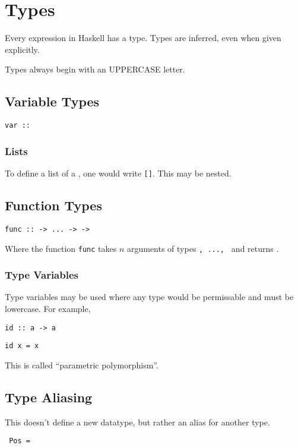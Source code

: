 \section{Types}

Every expression in Haskell has a type. Types are inferred, even when given explicitly.

Types always begin with an UPPERCASE letter.

\subsection{Variable Types}

\begin{center}
  \texttt{var :: }
\end{center}

\subsubsection{Lists}

To define a list of a \texttt{}, one would write \texttt{[]}. This may be nested.

\subsection{Function Types}

\begin{center}
  \texttt{func ::  -> ... ->  -> }
\end{center}

Where the function \texttt{func} takes $n$ arguments of types \texttt{, ..., } and returns \texttt{}.

\subsubsection{Type Variables}

Type variables may be used where any type would be permissable and must be lowercase. For example,

\begin{center}
  \texttt{id :: a -> a}

  \texttt{id x = x}
\end{center}

This is called ``parametric polymorphism''.

\subsection{Type Aliasing}
This doesn't define a new datatype, but rather an alias for another type.
\begin{center}
  \texttt{ Pos = }
\end{center}

